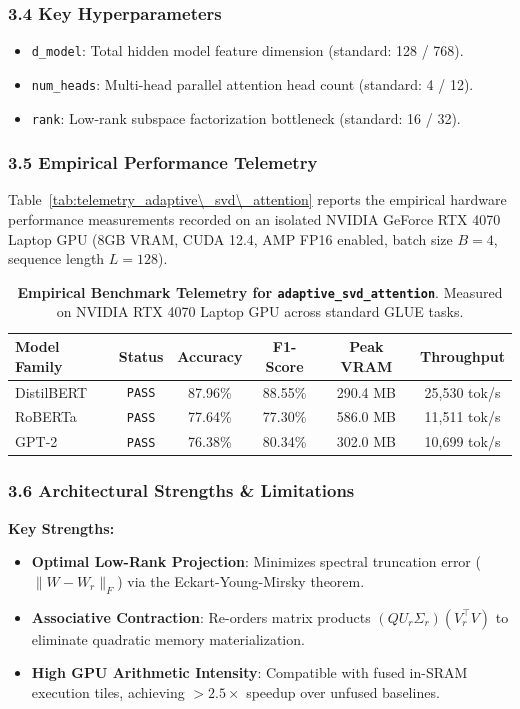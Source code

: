\subsubsection*{3.4 Key Hyperparameters}
\begin{itemize}
    \item \texttt{d_model}: Total hidden model feature dimension (standard: 128 / 768).
    \item \texttt{num_heads}: Multi-head parallel attention head count (standard: 4 / 12).
    \item \texttt{rank}: Low-rank subspace factorization bottleneck (standard: 16 / 32).
\end{itemize}

\subsubsection*{3.5 Empirical Performance Telemetry}
Table~\ref{tab:telemetry_adaptive\_svd\_attention} reports the empirical hardware performance measurements recorded on an isolated NVIDIA GeForce RTX 4070 Laptop GPU (8GB VRAM, CUDA 12.4, AMP FP16 enabled, batch size $B=4$, sequence length $L=128$).

\begin{table}[h]
\centering
\small
\caption{\textbf{Empirical Benchmark Telemetry for \texttt{adaptive\_svd\_attention}}. Measured on NVIDIA RTX 4070 Laptop GPU across standard GLUE tasks.}
\label{tab:telemetry_adaptive_svd_attention}
\begin{tabular*}{\columnwidth}{@{\extracolsep{\fill}}lccccc}
\toprule
\textbf{Model Family} & \textbf{Status} & \textbf{Accuracy} & \textbf{F1-Score} & \textbf{Peak VRAM} & \textbf{Throughput} \\
\midrule
DistilBERT & \texttt{PASS} & 87.96\% & 88.55\% & 290.4 MB & 25,530 tok/s \\
RoBERTa & \texttt{PASS} & 77.64\% & 77.30\% & 586.0 MB & 11,511 tok/s \\
GPT-2 & \texttt{PASS} & 76.38\% & 80.34\% & 302.0 MB & 10,699 tok/s \\
\bottomrule
\end{tabular*}
\end{table}

\subsubsection*{3.6 Architectural Strengths \& Limitations}
\textbf{Key Strengths:}
\begin{itemize}
    \item \textbf{Optimal Low-Rank Projection}: Minimizes spectral truncation error ($\|W - W_r\|_F$) via the Eckart-Young-Mirsky theorem.
    \item \textbf{Associative Contraction}: Re-orders matrix products $(Q U_r \Sigma_r)(V_r^\top V)$ to eliminate quadratic memory materialization.
    \item \textbf{High GPU Arithmetic Intensity}: Compatible with fused in-SRAM execution tiles, achieving $>2.5\times$ speedup over unfused baselines.
\end{itemize}

